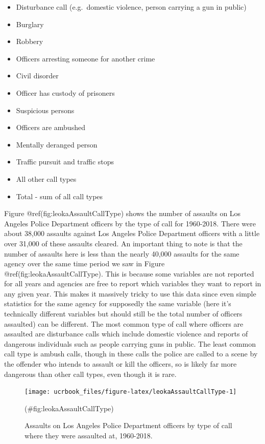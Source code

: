 \documentclass[
  12pt,
  openany]{book}
\providecommand{\tightlist}{%
  \setlength{\itemsep}{0pt}\setlength{\parskip}{0pt}}
\begin{document}
\begin{itemize}
\tightlist
\item
  Disturbance call (e.g.~domestic violence, person carrying a gun in public)
\item
  Burglary
\item
  Robbery
\item
  Officers arresting someone for another crime
\item
  Civil disorder
\item
  Officer has custody of prisoners
\item
  Suspicious persons
\item
  Officers are ambushed
\item
  Mentally deranged person
\item
  Traffic pursuit and traffic stops
\item
  All other call types
\item
  Total - sum of all call types
\end{itemize}

Figure @ref(fig:leokaAssaultCallType) shows the number of assaults on Los Angeles Police Department officers by the type of call for 1960-2018. There were about 38,000 assaults against Los Angeles Police Department officers with a little over 31,000 of these assaults cleared. An important thing to note is that the number of assaults here is less than the nearly 40,000 assaults for the same agency over the same time period we saw in Figure @ref(fig:leokaAssaultCallType). This is because some variables are not reported for all years and agencies are free to report which variables they want to report in any given year. This makes it massively tricky to use this data since even simple statistics for the same agency for supposedly the same variable (here it's technically different variables but should still be the total number of officers assaulted) can be different. The most common type of call where officers are assaulted are disturbance calls which include domestic violence and reports of dangerous individuals such as people carrying guns in public. The least common call type is ambush calls, though in these calls the police are called to a scene by the offender who intends to assault or kill the officers, so is likely far more dangerous than other call types, even though it is rare.

\begin{figure}

{\centering \texttt{[image: ucrbook\_files/figure-latex/leokaAssaultCallType-1]} 

}

\caption{Assaults on Los Angeles Police Department officers by type of call where they were assaulted at, 1960-2018.}(\#fig:leokaAssaultCallType)
\end{figure}
\end{document}
